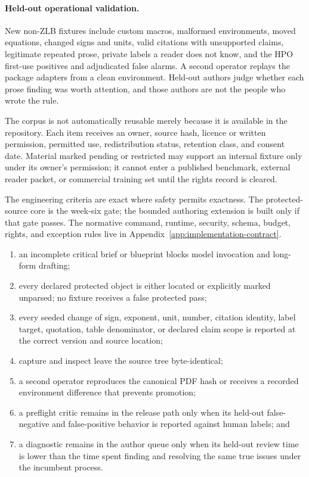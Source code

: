 \paragraph{Held-out operational validation.} New non-ZLB fixtures include
custom macros, malformed environments, moved equations, changed signs and
 units, valid citations with unsupported claims, legitimate repeated prose,
 private labels a reader does not know, and the HPO first-use positives and
 adjudicated false alarms. A second operator replays the package adapters from
 a clean environment. Held-out authors judge whether each prose finding was
 worth attention, and those authors are not the people who wrote the rule.

The corpus is not automatically reusable merely because it is available in the
repository. Each item receives an owner, source hash, licence or written
permission, permitted use, redistribution status, retention class, and consent
date. Material marked pending or restricted may support an internal fixture only
under its owner's permission; it cannot enter a published benchmark, external
reader packet, or commercial training set until the rights record is cleared.

The engineering criteria are exact where safety permits exactness. The
protected-source core is the week-six gate; the bounded authoring extension is
built only if that gate passes. The normative command, runtime, security,
schema, budget, rights, and exception rules live in
Appendix~\ref{app:implementation-contract}.

\begin{enumerate}
\item an incomplete critical brief or blueprint blocks model invocation and
      long-form drafting;
\item every declared protected object is either located or explicitly marked
      unparsed; no fixture receives a false protected pass;
\item every seeded change of sign, exponent, unit, number, citation identity,
      label target, quotation, table denominator, or declared claim scope is
      reported at the correct version and source location;
\item capture and inspect leave the source tree byte-identical;
\item a second operator reproduces the canonical PDF hash or receives a
      recorded environment difference that prevents promotion;
\item a preflight critic remains in the release path only when its held-out
      false-negative and false-positive behavior is reported against human
      labels; and
\item a diagnostic remains in the author queue only when its held-out review
      time is lower than the time spent finding and resolving the same true
      issues under the incumbent process.
\end{enumerate}

